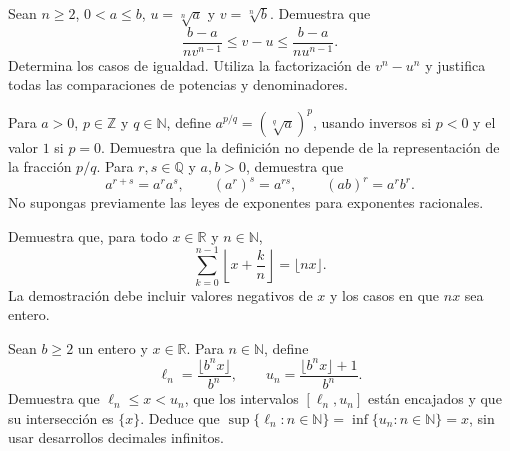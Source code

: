 \begin{samepage}
\begin{problem}\label{prob:reto-distribucion-04}
Sean $n\ge2$, $0<a\le b$, $u=\sqrt[n]{a}$ y $v=\sqrt[n]{b}$. Demuestra que
\[
\frac{b-a}{n v^{n-1}}\le v-u\le\frac{b-a}{n u^{n-1}}.
\]
Determina los casos de igualdad. Utiliza la factorización de $v^n-u^n$ y justifica todas las comparaciones de potencias y denominadores.
\end{problem}
\end{samepage}
\par{}

\begin{samepage}
\begin{problem}\label{prob:reto-distribucion-05}
Para $a>0$, $p\in\mathbb Z$ y $q\in\mathbb N$, define $a^{p/q}=(\sqrt[q]{a})^p$, usando inversos si $p<0$ y el valor $1$ si $p=0$. Demuestra que la definición no depende de la representación de la fracción $p/q$. Para $r,s\in\mathbb Q$ y $a,b>0$, demuestra que
\[
a^{r+s}=a^r a^s,\qquad (a^r)^s=a^{rs},\qquad (ab)^r=a^r b^r.
\]
No supongas previamente las leyes de exponentes para exponentes racionales.
\end{problem}
\end{samepage}
\par{}

\begin{samepage}
\begin{problem}\label{prob:reto-distribucion-06}
Demuestra que, para todo $x\in\mathbb R$ y $n\in\mathbb N$,
\[
\sum_{k=0}^{n-1}\left\lfloor x+\frac{k}{n}\right\rfloor=\lfloor nx\rfloor.
\]
La demostración debe incluir valores negativos de $x$ y los casos en que $nx$ sea entero.~\cite{mseHermite}
\end{problem}
\end{samepage}
\par{}

\begin{samepage}
\begin{problem}\label{prob:reto-distribucion-07}
Sean $b\ge2$ un entero y $x\in\mathbb R$. Para $n\in\mathbb N$, define
\[
\ell_n=\frac{\lfloor b^n x\rfloor}{b^n},\qquad
u_n=\frac{\lfloor b^n x\rfloor+1}{b^n}.
\]
Demuestra que $\ell_n\le x<u_n$, que los intervalos $[\ell_n,u_n]$ están encajados y que su intersección es $\{x\}$. Deduce que $\sup\{\ell_n:n\in\mathbb N\}=\inf\{u_n:n\in\mathbb N\}=x$, sin usar desarrollos decimales infinitos.~\cite{mseDecimal}
\end{problem}
\end{samepage}
\par{}

